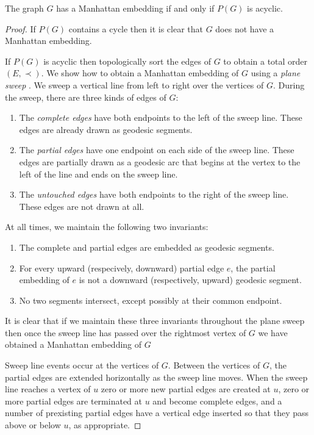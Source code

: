 \documentclass[lotsofwhite]{patmorin}
\begin{document}
\begin{lem}
The graph $G$ has a Manhattan embedding if and only if $P(G)$ is
acyclic.
\end{lem}

\begin{proof}
If $P(G)$ contains a cycle then it is clear that $G$ does not have a
Manhattan embedding.

If $P(G)$ is acyclic then topologically sort the edges of $G$ to
obtain a total order $(E,\prec)$. We show how to obtain a Manhattan
embedding of $G$ using a \emph{plane sweep} \cite{boXX}.  We sweep a
vertical line from left to right over the vertices of $G$.  During the
sweep, there are three kinds of edges of $G$:
\begin{enumerate}

\item The \emph{complete edges} have both endpoints to the left of the
sweep line.  These edges are already drawn as geodesic segments.

\item The \emph{partial edges} have one endpoint on each side of the
sweep line.  These edges are partially drawn as a geodesic arc that
begins at the vertex to the left of the line and ends on the sweep
line.

\item The \emph{untouched edges} have both endpoints to the right of
the sweep line.  These edges are not drawn at all.
\end{enumerate}
At all times, we maintain the following two invariants:
\begin{enumerate}

\item The complete and partial edges are embedded as geodesic
segments.

\item For every upward (respecively, downward) partial edge $e$, the
partial embedding of $e$ is not a downward (respectively, upward)
geodesic segment.

\item No two segments intersect, except possibly at their common
endpoint.
\end{enumerate}
It is clear that if we maintain these three invariants throughout the
plane sweep then once the sweep line has passed over the rightmost
vertex of $G$ we have obtained a Manhattan embedding of $G$ 

Sweep line events occur at the vertices of $G$.  Between the vertices
of $G$, the partial edges are extended horizontally as the sweep line
moves.  When the sweep line reaches a vertex of $u$ zero or more new
partial edges are created at $u$, zero or more partial edges are
terminated at $u$ and become complete edges, and a number of
prexisting partial edges have a vertical edge inserted so that they
pass above or below $u$, as appropriate. 


\end{proof}
\end{document}
